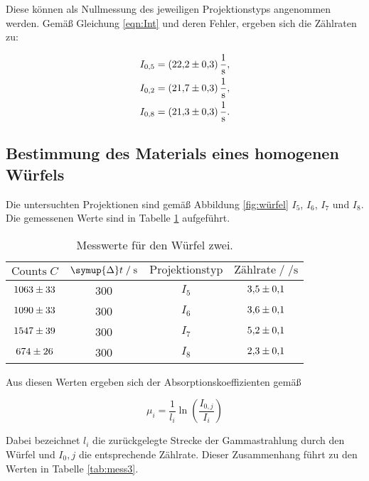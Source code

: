 Diese können als Nullmessung des jeweiligen Projektionstyps angenommen werden. Gemäß Gleichung \eqref{eqn:Int} und deren Fehler, ergeben
sich die Zählraten zu: 

\begin{align*}
  I_{0,5} &= \SI{22.2+-0.3}{\per\second},\\ 
  I_{0,2} &= \SI{21.7+-0.3}{\per\second},\\ 
  I_{0,8} &= \SI{21.3+-0.3}{\per\second}.   
\end{align*}

\subsection{Bestimmung des Materials eines homogenen Würfels}

Die untersuchten Projektionen sind gemäß Abbildung \ref{fig:würfel} $I_5$, $I_6$, $I_7$ und $I_8$. Die gemessenen Werte sind in 
Tabelle \ref{tab:mess2} aufgeführt. 

\begin{table}[H]
  \centering
  \caption{Messwerte für den Würfel zwei.}
  \label{tab:mess2}
  \begin{tabular}{c c c c}
  \toprule
  $\text{Counts} \; C$ & $\symup{\Delta} t \;/\; \si{\second}$ & $\text{Projektionstyp}$ & $\text{Zählrate} \;/\; \si{\per\second}$\\
  \midrule
      $\num{1063+-33}$ & 300 & $I_{5}$ & $\num{3.5+-0.1}$\\
      $\num{1090+-33}$ & 300 & $I_{6}$ & $\num{3.6+-0.1}$\\
      $\num{1547+-39}$ & 300 & $I_{7}$ & $\num{5.2+-0.1}$\\
      $\num{674+-26}$ & 300 & $I_{8}$  & $\num{2.3+-0.1}$\\
  \bottomrule
  \end{tabular}
\end{table}

Aus diesen Werten ergeben sich der Absorptionskoeffizienten gemäß 

\begin{equation*}
  \mu_i = \frac{1}{l_i}\ln{\left(\frac{I_{0,j}}{I_i}\right)}
\end{equation*}

Dabei bezeichnet $l_i$ die zurückgelegte Strecke der Gammastrahlung durch den Würfel und $I_0,j$ die entsprechende Zählrate. Dieser 
Zusammenhang führt zu den Werten in Tabelle \ref{tab:mess3}.

